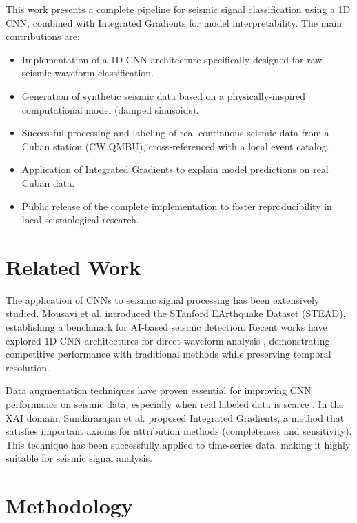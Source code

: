 \documentclass[10pt,a4paper]{article}
\begin{document}
This work presents a complete pipeline for seismic signal classification using a 1D CNN, combined with Integrated Gradients for model interpretability. The main contributions are:

\begin{itemize}
\item Implementation of a 1D CNN architecture specifically designed for raw seismic waveform classification.
\item Generation of synthetic seismic data based on a physically-inspired computational model (damped sinusoids).
\item Successful processing and labeling of real continuous seismic data from a Cuban station (CW.QMBU), cross-referenced with a local event catalog.
\item Application of Integrated Gradients to explain model predictions on real Cuban data.
\item Public release of the complete implementation to foster reproducibility in local seismological research.
\end{itemize}

\section{Related Work}

The application of CNNs to seismic signal processing has been extensively studied. Mousavi et al. \cite{mousavi2019stead} introduced the STanford EArthquake Dataset (STEAD), establishing a benchmark for AI-based seismic detection. Recent works have explored 1D CNN architectures for direct waveform analysis \cite{ieee2024cnn, repository2024ncsu}, demonstrating competitive performance with traditional methods while preserving temporal resolution.

Data augmentation techniques have proven essential for improving CNN performance on seismic data, especially when real labeled data is scarce \cite{science2025augmentation}. In the XAI domain, Sundararajan et al. \cite{sundararajan2017axiomatic} proposed Integrated Gradients, a method that satisfies important axioms for attribution methods (completeness and sensitivity). This technique has been successfully applied to time-series data, making it highly suitable for seismic signal analysis.

\section{Methodology}
\end{document}
